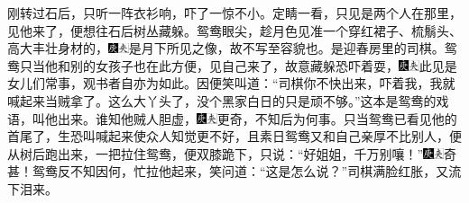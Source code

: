 刚转过石后，只听一阵衣衫响，吓了一惊不小。定睛一看，只见是两个人在那里，见他来了，便想往石后树丛藏躲。鸳鸯眼尖，趁月色见准一个穿红裙子、梳鬅头、高大丰壮身材的，{\includegraphics[width=3mm]{../Images/00004}\includegraphics[width=3mm]{../Images/00012}\footnotesize \kaishu 是月下所见之像，故不写至容貌也。}是迎春房里的司棋。鸳鸯只当他和别的女孩子也在此方便，见自己来了，故意藏躲恐吓着耍，{\includegraphics[width=3mm]{../Images/00004}\includegraphics[width=3mm]{../Images/00012}\footnotesize \kaishu 此见是女儿们常事，观书者自亦为如此。}因便笑叫道：``司棋你不快出来，吓着我，我就喊起来当贼拿了。这么大丫头了，没个黑家白日的只是顽不够。''这本是鸳鸯的戏语，叫他出来。谁知他贼人胆虚，{\includegraphics[width=3mm]{../Images/00004}\includegraphics[width=3mm]{../Images/00012}\footnotesize \kaishu 更奇，不知后为何事。}只当鸳鸯已看见他的首尾了，生恐叫喊起来使众人知觉更不好，且素日鸳鸯又和自己亲厚不比别人，便从树后跑出来，一把拉住鸳鸯，便双膝跪下，只说：``好姐姐，千万别嚷！''{\includegraphics[width=3mm]{../Images/00004}\includegraphics[width=3mm]{../Images/00012}\footnotesize \kaishu 奇甚！}鸳鸯反不知因何，忙拉他起来，笑问道：``这是怎么说？''司棋满脸红胀，又流下泪来。

